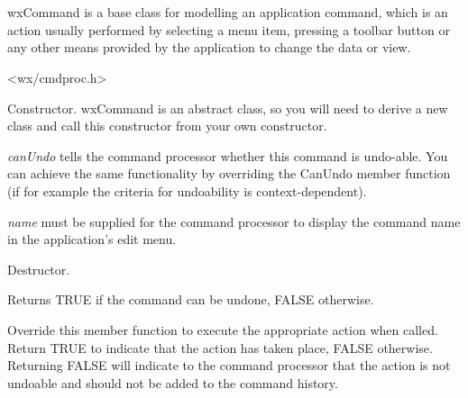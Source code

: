\section{}\label{wxcommand}

wxCommand is a base class for modelling an application command,
which is an action usually performed by selecting a menu item, pressing
a toolbar button or any other means provided by the application to
change the data or view.




<wx/cmdproc.h>






Constructor. wxCommand is an abstract class, so you will need to derive
a new class and call this constructor from your own constructor.

{\it canUndo} tells the command processor whether this command is undo-able. You
can achieve the same functionality by overriding the CanUndo member function (if for example
the criteria for undoability is context-dependent).

{\it name} must be supplied for the command processor to display the command name
in the application's edit menu.



Destructor.



Returns TRUE if the command can be undone, FALSE otherwise.



Override this member function to execute the appropriate action when called.
Return TRUE to indicate that the action has taken place, FALSE otherwise.
Returning FALSE will indicate to the command processor that the action is
not undoable and should not be added to the command history.

